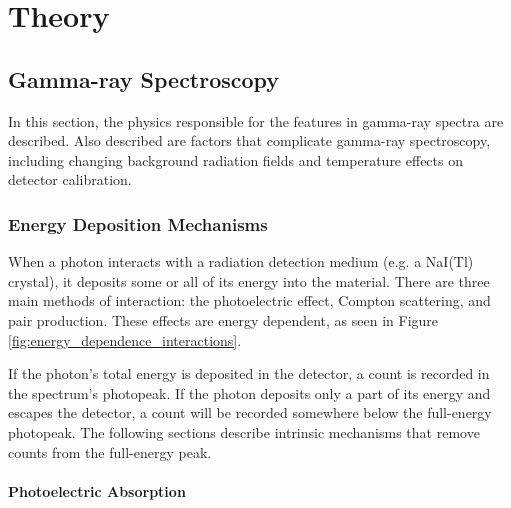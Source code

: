 \chapter{Theory}

\section{Gamma-ray Spectroscopy}

In this section, the physics responsible for the features in gamma-ray spectra are described. Also described are factors that complicate gamma-ray spectroscopy, including changing background radiation fields and temperature effects on detector calibration.


\subsection{Energy Deposition Mechanisms}

When a photon interacts with a radiation detection medium (e.g. a NaI(Tl) crystal), it deposits some or all of its energy into the material. There are three main methods of interaction: the photoelectric effect, Compton scattering, and pair production. These effects are energy dependent, as seen in Figure \ref{fig:energy_dependence_interactions}.

If the photon's total energy is deposited in the detector, a count is recorded in the spectrum's photopeak. If the photon deposits only a part of its energy and escapes the detector, a count will be recorded somewhere below the full-energy photopeak.  The following sections describe intrinsic mechanisms that remove counts from the full-energy peak. %


\subsubsection{Photoelectric Absorption}

